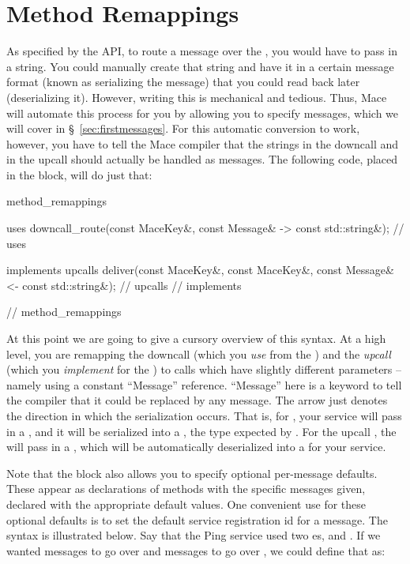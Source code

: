 \section{Method Remappings}
\label{sec:method-remappings}
As specified by the  API, to route a
message over the , you would have to pass in a
string.  You could manually create that string and have it in a
certain message format (known as serializing the message) that you
could read back later (deserializing it).  However, writing this is
mechanical and tedious.  Thus, Mace will automate this process for you
by allowing you to specify messages, which we will cover in
\S~\ref{sec:firstmessages}.  For this automatic conversion to work,
however, you have to tell the Mace compiler that the strings in the
 downcall and in the  upcall
should actually be handled as messages.  The following code, placed in
the  block, will do just that:

\begin{programlisting}
method_remappings {
  uses {
    downcall_route(const MaceKey&, const Message& -> const std::string&);
  } // uses

  implements {
    upcalls {
      deliver(const MaceKey&, const MaceKey&, const Message& <- const std::string&);
    } // upcalls
  } // implements
} // method_remappings
\end{programlisting}

At this point we are going to give a cursory overview of this syntax.
At a high level, you are remapping the  downcall
(which you \emph{use} from the ) and the
 \emph{upcall} (which you \emph{implement} for the
) to calls which have slightly different
parameters -- namely using a constant ``Message'' reference.
``Message'' here is a keyword to tell the compiler that it could be
replaced by any message.  The arrow just denotes the direction in
which the serialization occurs.  That is, for
, your service will pass in a
, and it will be serialized into a
, the type expected by .
For the upcall , the 
will pass in a , which will be automatically
deserialized into a  for your service.

Note that the  block also allows you to specify optional
per-message defaults.  These appear as declarations of methods with the 
specific messages given, declared with the appropriate default values.
One convenient use for these optional defaults
is to set the default service registration id for a message.  The
syntax is illustrated below.  Say that the Ping service used two
es,  and
.  If we wanted  messages to go over
 and  messages to go over
, we could define that as:

